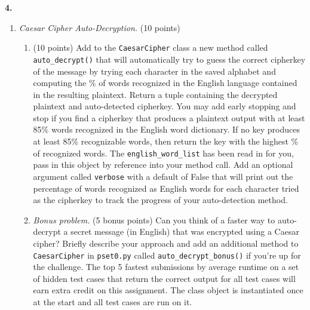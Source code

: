 \documentclass[12pt]{amsart}
\newenvironment{statement}[1]{\smallskip\noindent\color[rgb]{0.0,0.0,0.0} {\bf #1.}}{}
\theoremstyle{definition}
\theoremstyle{remark}
\newcommand{\1}{\mathds{1}}
\begin{document}
\begin{statement}{4}
\begin{enumerate}
    \newpage
    \item \textit{Caesar Cipher Auto-Decryption.} (10 points)
        \begin{enumerate}
            \item (10 points) Add to the \texttt{CaesarCipher} class a new method called \texttt{auto\_decrypt()} that will automatically try to guess the correct cipherkey of the message by trying each character in the saved alphabet and computing the \% of words recognized in the English language contained in the resulting plaintext. Return a tuple containing the decrypted plaintext and  auto-detected cipherkey. You may add early stopping and stop if you find a cipherkey that produces a plaintext output with  at least 85\% words recognized in the English word dictionary. If no key produces at least 85\% recognizable words, then return the key with the highest \% of recognized words. The \texttt{english\_word\_list} has been read in for you, pass in this object by reference into your method call. Add an optional argument called \texttt{verbose} with a default of False that will print out the percentage of words recognized as English words for each character tried as the cipherkey to track the progress of your auto-detection method.
            \item \textit{Bonus problem.} (5 bonus points) Can you think of a faster way to auto-decrypt a secret message (in English) that was encrypted using a Caesar cipher? Briefly describe your approach and add an additional method to \texttt{CaesarCipher} in \texttt{pset0.py} called \texttt{auto\_decrypt\_bonus()} if you're up for the challenge. The top 5 fastest submissions by average runtime on a set of hidden test cases that return the correct output for all test cases will earn extra credit on this assignment. The class object is instantiated once at the start and all test cases are run on it.
            

\end{enumerate}
\end{enumerate}
\end{statement}
\end{document}
